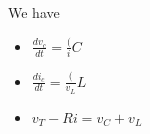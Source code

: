 \documentclass[preview]{standalone}
\begin{document}
\begin{center}
\raggedright
                We have 
                \begin{itemize}
                  \item $\frac{dv_c}{dt} = \frac({i}{C}$
                  \item $\frac{di_c}{dt} = \frac({v_L}{L}$
                  \item $v_T - Ri = v_C + v_L $
                \end{itemize}
\end{center}
\end{document}

